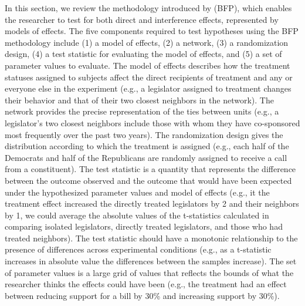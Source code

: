 \documentclass[12pt]{article}
\begin{document}
In this section, we review the methodology introduced by \citet{bowers2012reasoning} (BFP), which enables the researcher to test for both direct and interference effects, represented by models of effects. The five components required to test hypotheses using the BFP methodology include (1) a model of effects, (2) a network, (3) a randomization design, (4) a test statistic for evaluating the model of effects, and (5) a set of parameter values to evaluate. The model of effects describes how the treatment statuses assigned to subjects affect the direct recipients of treatment and any or everyone else in the experiment (e.g., a legislator assigned to treatment changes their behavior and that of their two closest neighbors in the network). The network provides the precise representation of the ties between units (e.g., a legislator's two closest neighbors include those with whom they have co-sponsored most frequently over the past two years). The randomization design gives the distribution according to which the treatment is assigned (e.g., each half of the Democrats and half of the Republicans are randomly assigned to receive a call from a constituent). The test statistic is a quantity that represents the difference between the outcome observed and the outcome that would have been expected under the hypothesized parameter values and model of effects (e.g., it the treatment effect increased the directly treated legislators by 2 and their neighbors by 1, we could average the absolute values of the t-statistics calculated in comparing isolated legislators, directly treated legislators, and those who had treated neighbors). The test statistic should have a monotonic relationship to the presence of differences across experimental conditions (e.g., as a t-statistic increases in absolute value the differences between the samples increase). The set of parameter values is a large grid of values that reflects the bounds of what the researcher thinks the effects could have been (e.g., the treatment had an effect between reducing support for a bill by 30\% and increasing support by 30\%). 
\end{document}
